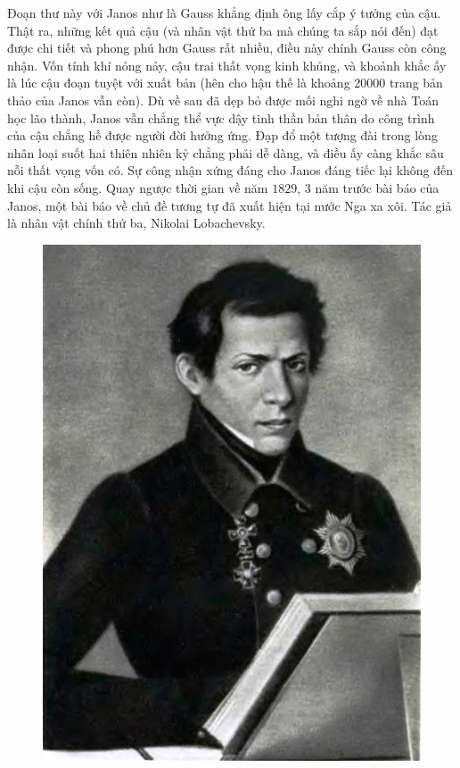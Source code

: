 \begin{multicols}{2}
	\vskip 0.1cm
	Đoạn thư này với Janos như là Gauss khẳng định ông lấy cắp ý tưởng của cậu. Thật ra, những kết quả cậu (và nhân vật thứ ba mà chúng ta sắp nói đến) đạt được chi tiết và phong phú hơn Gauss rất nhiều, điều này chính Gauss còn công nhận. Vốn tính khí nóng nảy, cậu trai thất vọng kinh khủng, và khoảnh khắc ấy là lúc cậu đoạn tuyệt với xuất bản (hên cho hậu thế là khoảng $20000$ trang bản thảo của Janos vẫn còn). Dù về sau đã dẹp bỏ được mối nghi ngờ về nhà Toán học lão thành, Janos vẫn chẳng thể vực dậy tinh thần bản thân do công trình của cậu chẳng hề được người đời hưởng ứng. Đạp đổ một tượng đài trong lòng nhân loại suốt hai thiên nhiên kỷ chẳng phải dễ dàng, và điều ấy càng khắc sâu nỗi thất vọng vốn có. Sự công nhận xứng đáng cho Janos đáng tiếc lại không đến khi cậu còn sống.
	\vskip 0.1cm
	Quay ngược thời gian về năm $1829$, $3$ năm trước bài báo của Janos, một bài báo về chủ đề tương tự đã xuất hiện tại nước Nga xa xôi. Tác giả là nhân vật chính thứ ba, Nikolai Lobachevsky. 
	\begin{figure}[H]
		\vspace*{-5pt}
		\centering
		\captionsetup{labelformat= empty, justification=centering}
		\includegraphics[width= 1\linewidth]{Lobachevsky_03_crop}

\end{figure}
\end{multicols}
